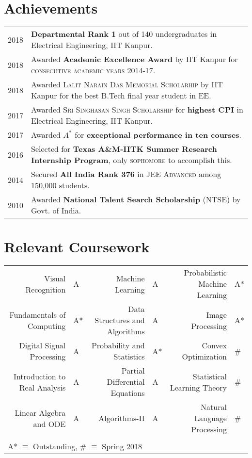 \documentclass[a4paper,10pt]{article}
\begin{document}
\section{Achievements}
\begin{tabular}{rl}
2018 & \textbf{Departmental Rank 1} out of 140 undergraduates in Electrical
Engineering, IIT Kanpur.\\
2018 & Awarded \textbf{Academic Excellence Award} by IIT Kanpur for \textsc{consecutive academic years 2014-17}.\\
2018 & Awarded \textsc{Lalit Narain Das Memorial Scholarhip} by IIT Kanpur for the best B.Tech final year student in EE.\\
2017 & Awarded \textsc{Sri Singhasan Singh Scholarship} for \textbf{highest CPI} in Electrical Engineering, IIT Kanpur.\\
2017 & Awarded $A^*$ for \textbf{exceptional performance in ten courses}.\\
2016 & Selected for \textbf{Texas A\&M-IITK Summer Research Internship Program}, only \textsc{sophomore} to accomplish this.\\
2014 & Secured \textbf{All India Rank 376} in \textsc{JEE Advanced} among 150,000 students.\\
2010 & Awarded \textbf{National Talent Search Scholarship} (NTSE) by Govt. of India.

\end{tabular}
\section{Relevant Coursework}
\centering
\begin{tabular}{rl|rl|rl}
Visual Recognition & A & Machine Learning & A & Probabilistic Machine Learning & A*\\
Fundamentals of Computing & A* & Data Structures and Algorithms & A & Image Processing & A*\\
Digital Signal Processing & A & Probability and Statistics & A* & Convex Optimization & \#\\
Introduction to Real Analysis & A & Partial Differential Equations & A & Statistical Learning Theory & \#\\
Linear Algebra and ODE & A & Algorithms-II & A & Natural Language Processing & \#\\ \\

\multicolumn{4}{l}{\footnotesize A* $\equiv$ Outstanding, \# $\equiv$ Spring 2018}\\
\end{tabular}
\end{document}
